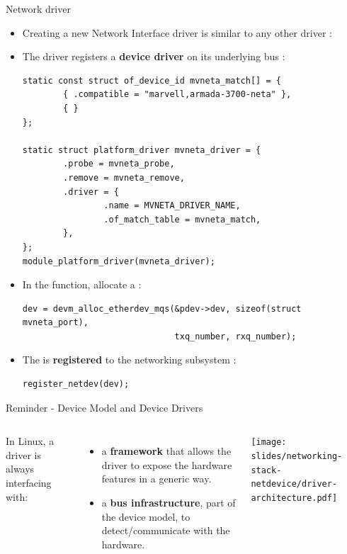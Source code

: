 \begin{frame}[fragile]{Network driver}
	\begin{itemize}
		\item Creating a new Network Interface driver is similar to any other driver :
			\item The driver registers a \textbf{device driver} on its underlying bus :
				{\fontsize{6}{7}\selectfont
				\begin{verbatim}
static const struct of_device_id mvneta_match[] = {
        { .compatible = "marvell,armada-3700-neta" },
        { }
};

static struct platform_driver mvneta_driver = {
        .probe = mvneta_probe,
        .remove = mvneta_remove,
        .driver = {
                .name = MVNETA_DRIVER_NAME,
                .of_match_table = mvneta_match,
        },
};
module_platform_driver(mvneta_driver);
				\end{verbatim}
				}
			\item In the  function, allocate a  :
				{\fontsize{6}{7}\selectfont
				\begin{verbatim}
dev = devm_alloc_etherdev_mqs(&pdev->dev, sizeof(struct mvneta_port),
                              txq_number, rxq_number);
				\end{verbatim}
					}
			\item The  is \textbf{registered} to the networking subsystem :
				{\fontsize{6}{7}\selectfont
				\begin{verbatim}
register_netdev(dev);
				\end{verbatim}
				}
	\end{itemize}
\end{frame}

\begin{frame}{Reminder - Device Model and Device Drivers}
  \begin{columns}
     In Linux, a driver is always interfacing
    with:
    \begin{itemize}
    \item a {\bf framework} that allows the driver to expose the
      hardware features in a generic way.
    \item a {\bf bus infrastructure}, part of the device model, to
      detect/communicate with the hardware.
    \end{itemize}
    \texttt{[image: slides/networking-stack-netdevice/driver-architecture.pdf]}
  \end{columns}
\end{frame}

